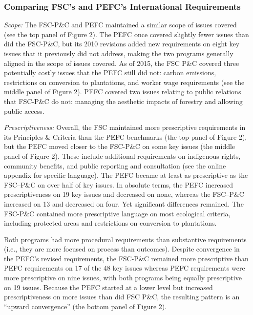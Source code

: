 \documentclass[
      12pt,
            Review ]{article}
\begin{document}
\hypertarget{comparing-fscs-and-pefcs-international-requirements}{%
\subsubsection{Comparing FSC's and PEFC's International Requirements}\label{comparing-fscs-and-pefcs-international-requirements}}

\emph{Scope:} The FSC-P\&C and PEFC maintained a similar scope of issues covered (see the top panel of Figure 2). The PEFC once covered slightly fewer issues than did the FSC-P\&C, but its 2010 revisions added new requirements on eight key issues that it previously did not address, making the two programs generally aligned in the scope of issues covered. As of 2015, the FSC P\&C covered three potentially costly issues that the PEFC still did not: carbon emissions, restrictions on conversion to plantations, and worker wage requirements (see the middle panel of Figure 2). PEFC covered two issues relating to public relations that FSC-P\&C do not: managing the aesthetic impacts of forestry and allowing public access.

\emph{Prescriptiveness:} Overall, the FSC maintained more prescriptive requirements in its Principles \& Criteria than the PEFC benchmarks (the top panel of Figure 2), but the PEFC moved closer to the FSC-P\&C on some key issues (the middle panel of Figure 2). These include additional requirements on indigenous rights, community benefits, and public reporting and consultation (see the online appendix for specific language). The PEFC became at least as prescriptive as the FSC--P\&C on over half of key issues. In absolute terms, the PEFC increased prescriptiveness on 19 key issues and decreased on none, whereas the FSC--P\&C increased on 13 and decreased on four. Yet significant differences remained. The FSC-P\&C contained more prescriptive language on most ecological criteria, including protected areas and restrictions on conversion to plantations.

Both programs had more procedural requirements than substantive requirements (i.e., they are more focused on process than outcomes). Despite convergence in the PEFC's revised requirements, the FSC-P\&C remained more prescriptive than PEFC requirements on 17 of the 48 key issues whereas PEFC requirements were more prescriptive on nine issues, with both programs being equally prescriptive on 19 issues. Because the PEFC started at a lower level but increased prescriptiveness on more issues than did FSC P\&C, the resulting pattern is an ``upward convergence'' (the bottom panel of Figure 2).
\end{document}
